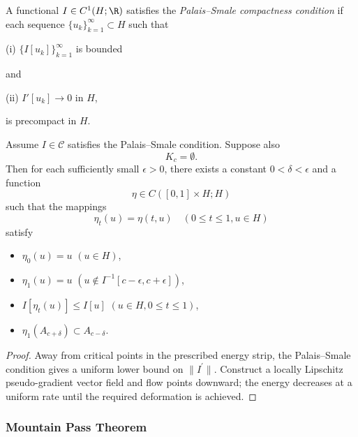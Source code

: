 \begin{definition}
\label{def:palais-smale-condition}
A functional $I \in C^1(H;\R)$ satisfies the \textit{Palais--Smale compactness condition} if each sequence $\{u_k\}_{k=1}^\infty \subset H$ such that

(i) $\{I[u_k]\}_{k=1}^\infty$ is bounded

and

(ii) $I'[u_k] \to 0$ in $H$,

is precompact in $H$.
\end{definition}

\begin{theorem}
\label{thm:deformation-theorem}
Assume $I \in \mathcal{C}$ satisfies the Palais--Smale condition. Suppose also
\[
K_c = \emptyset.
\tag{3}
\]
Then for each sufficiently small $\epsilon > 0$, there exists a constant $0 < \delta < \epsilon$ and a function
\[
\eta \in C([0,1] \times H; H)
\]
such that the mappings
\[
\eta_t(u) = \eta(t, u) \quad (0 \le t \le 1, u \in H)
\]
satisfy
\begin{itemize}
\item[(i)] $\eta_0(u) = u$ \quad $(u \in H)$,
\item[(ii)] $\eta_1(u) = u$ \quad $(u \notin I^{-1}[c - \epsilon, c + \epsilon])$,
\item[(iii)] $I[\eta_t(u)] \le I[u]$ \quad $(u \in H, 0 \le t \le 1)$,
\item[(iv)] $\eta_1(A_{c+\delta}) \subset A_{c-\delta}$.
\end{itemize}
\end{theorem}

\begin{proof}
\sketch Away from critical points in the prescribed energy strip, the Palais--Smale condition gives a uniform lower bound on $\|I^{\prime}\|$. Construct a locally Lipschitz pseudo-gradient vector field and flow points downward; the energy decreases at a uniform rate until the required deformation is achieved.
\end{proof}

\subsubsection{Mountain Pass Theorem}

